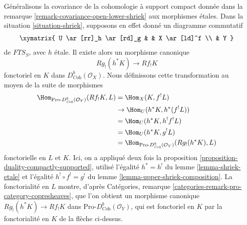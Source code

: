 \begin{remark}
\label{remark-covariance-etale-lower-shriek}
Généralisons la covariance de la cohomologie à support compact donnée dans la remarque \ref{remark-covariance-open-lower-shriek} aux morphismes \'etales. Dans la situation \ref{situation-shriek}, supposons en effet donné un diagramme commutatif
$$
\xymatrix{
U \ar[rr]_h \ar[rd]_g & & X \ar[ld]^f \\
& Y
}
$$
de $\textit{FTS}_S$, avec $h$ \'etale. Il existe alors un morphisme canonique
$$
Rg_!(h^*K) \longrightarrow Rf_!K
$$
fonctoriel en $K$ dans $D^b_{\textit{Coh}}(\mathcal{O}_X)$. Nous définissons cette transformation au moyen de la suite de morphismes
\begin{align*}
\Hom_{\text{Pro-}D^b_{\textit{Coh}}(\mathcal{O}_Y)}(Rf_!K, L)
& =
\Hom_X(K, f^!L) \\
& \to
\Hom_U(h^*K, h^*(f^!L)) \\
& =
\Hom_U(h^*K, h^!f^!L) \\
& =
\Hom_U(h^*K, g^!L) \\
& =
\Hom_{\text{Pro-}D^b_{\textit{Coh}}(\mathcal{O}_Y)}(Rg_!(h^*K), L)
\end{align*}
fonctorielle en $L$ et $K$. Ici, on a appliqué deux fois la proposition \ref{proposition-duality-compactly-supported}, utilisé l'égalité $h^* = h^!$ du lemme \ref{lemma-shriek-etale} et l'égalité $h^! \circ f^! = g^!$ du lemme \ref{lemma-upper-shriek-composition}. La fonctorialité en $L$ montre, d'après Catégories, remarque \ref{categories-remark-pro-category-copresheaves}, que l'on obtient un morphisme canonique $Rg_!(h^*K) \to Rf_!K$ dans $\text{Pro-}D^b_{\textit{Coh}}(\mathcal{O}_Y)$, qui est fonctoriel en $K$ par la fonctorialité en $K$ de la flèche ci-dessus.
\end{remark}

